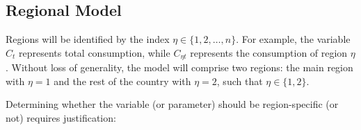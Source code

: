 \documentclass[
	12pt,
	]{article}
\numberwithin{equation}{section}
\theoremstyle{definition}
\theoremstyle{plain}
\theoremstyle{plain}
\theoremstyle{plain}
\begin{document}

\subsection{Regional Model}


Regions will be identified by the index $\eta \in \{1,2,\ldots,n\}$. For example, the variable $C_t$ represents total consumption, while $C_{\eta t}$ represents the consumption of region $\eta$. Without loss of generality, the model will comprise two regions: the main region with $\eta=1$ and the rest of the country with $\eta=2$, such that $\eta \in \{1,2\}$.

Determining whether the variable (or parameter) should be region-specific (or not) requires justification:


\end{document}
